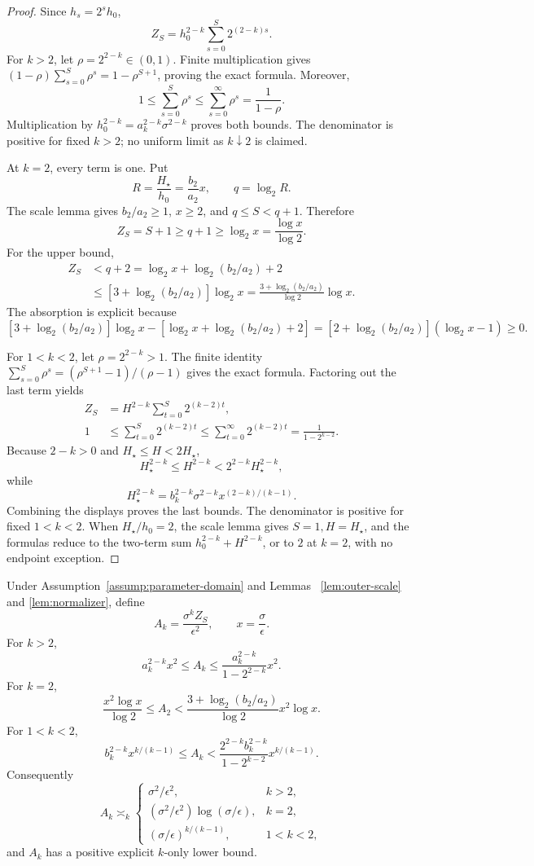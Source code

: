 \begin{proof}
Since $h_s=2^sh_0$,
\[
 Z_S=h_0^{2-k}\sum_{s=0}^S2^{(2-k)s}.
\]
For $k>2$, let $\rho=2^{2-k}\in(0,1)$.  Finite multiplication gives
$(1-\rho)\sum_{s=0}^S\rho^s=1-\rho^{S+1}$, proving the exact formula.
Moreover,
\[
 1\leq\sum_{s=0}^S\rho^s
 \leq\sum_{s=0}^\infty\rho^s=\frac1{1-\rho}.
\]
Multiplication by
$h_0^{2-k}=a_k^{2-k}\sigma^{2-k}$ proves both bounds.  The denominator
is positive for fixed $k>2$; no uniform limit as $k\downarrow2$ is claimed.

At $k=2$, every term is one.  Put
\[
 R=\frac{H_\star}{h_0}=\frac{b_2}{a_2}x,
 \qquad q=\log_2R.
\]
The scale lemma gives $b_2/a_2\geq1$, $x\geq2$, and
$q\leq S<q+1$.  Therefore
\[
 Z_S=S+1\geq q+1\geq\log_2x=\frac{\log x}{\log2}.
\]
For the upper bound,
\[
\begin{aligned}
 Z_S&<q+2
 =\log_2x+\log_2(b_2/a_2)+2\\
 &\leq[3+\log_2(b_2/a_2)]\log_2x
 =\frac{3+\log_2(b_2/a_2)}{\log2}\log x.
\end{aligned}
\]
The absorption is explicit because
\[
 [3+\log_2(b_2/a_2)]\log_2x
 -[\log_2x+\log_2(b_2/a_2)+2]
 =[2+\log_2(b_2/a_2)](\log_2x-1)\geq0.
\]

For $1<k<2$, let $\rho=2^{2-k}>1$.  The finite identity
$\sum_{s=0}^S\rho^s=(\rho^{S+1}-1)/(\rho-1)$ gives the exact formula.
Factoring out the last term yields
\[
\begin{aligned}
 Z_S&=H^{2-k}\sum_{t=0}^S2^{(k-2)t},\\
 1&\leq\sum_{t=0}^S2^{(k-2)t}
 \leq\sum_{t=0}^\infty2^{(k-2)t}
 =\frac1{1-2^{k-2}}.
\end{aligned}
\]
Because $2-k>0$ and $H_\star\leq H<2H_\star$,
\[
 H_\star^{2-k}\leq H^{2-k}<2^{2-k}H_\star^{2-k},
\]
while
\[
 H_\star^{2-k}=b_k^{2-k}\sigma^{2-k}
 x^{(2-k)/(k-1)}.
\]
Combining the displays proves the last bounds.  The denominator is positive
for fixed $1<k<2$.  When $H_\star/h_0=2$, the scale lemma gives
$S=1,H=H_\star$, and the formulas reduce to the two-term sum
$h_0^{2-k}+H^{2-k}$, or to $2$ at $k=2$, with no endpoint exception.
\end{proof}

\begin{proposition}
\label{prop:scale-rate}
Under Assumption~\ref{assump:parameter-domain} and Lemmas~
\ref{lem:outer-scale} and \ref{lem:normalizer}, define
\[
 A_k=\frac{\sigma^kZ_S}{\epsilon^2},
 \qquad x=\frac\sigma\epsilon.
\]
For $k>2$,
\[
 a_k^{2-k}x^2\leq A_k
 \leq\frac{a_k^{2-k}}{1-2^{2-k}}x^2.
\]
For $k=2$,
\[
 \frac{x^2\log x}{\log2}\leq A_2
 <\frac{3+\log_2(b_2/a_2)}{\log2}x^2\log x.
\]
For $1<k<2$,
\[
 b_k^{2-k}x^{k/(k-1)}\leq A_k
 <\frac{2^{2-k}b_k^{2-k}}{1-2^{k-2}}x^{k/(k-1)}.
\]
Consequently
\[
 A_k\asymp_k
 \begin{cases}
 \sigma^2/\epsilon^2,&k>2,\\
 (\sigma^2/\epsilon^2)\log(\sigma/\epsilon),&k=2,\\
 (\sigma/\epsilon)^{k/(k-1)},&1<k<2,
 \end{cases}
\]
and $A_k$ has a positive explicit $k$-only lower bound.
\end{proposition}

